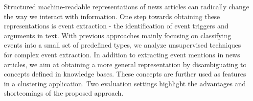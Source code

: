 Structured machine-readable representations of news articles can radically change the way we interact with information. One step towards obtaining these representations is event extraction - the identification of event triggers and arguments in text. With previous approaches mainly focusing on classifying events into a small set of predefined types, we analyze unsupervised techniques for complex event extraction. In addition to extracting event mentions in news articles, we aim at obtaining a more general representation by disambiguating to concepts defined in knowledge bases. These concepts are further used as features in a clustering application. Two evaluation settings highlight the advantages and shortcomings of the proposed approach.
